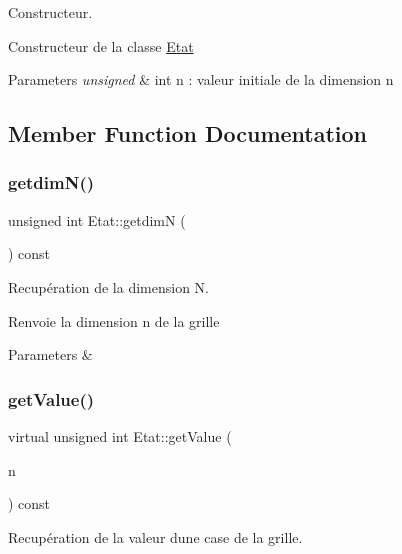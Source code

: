 Constructeur. 

Constructeur de la classe \mbox{\hyperlink{class_etat}{Etat}}


\begin{DoxyParams}{Parameters}
{\em unsigned} & int n \+: valeur initiale de la dimension n \\
\hline
\end{DoxyParams}


\subsection{Member Function Documentation}
\mbox{\label{class_etat_aa30f352f0cd2cc3058a5df552615638c}} 
\subsubsection{\texorpdfstring{getdim\+N()}{getdimN()}}
{\footnotesize\ttfamily unsigned int Etat\+::getdimN (\begin{DoxyParamCaption}{ }\end{DoxyParamCaption}) const\hspace{0.3cm}{\ttfamily [inline]}}



Recupération de la dimension N. 

Renvoie la dimension n de la grille


\begin{DoxyParams}{Parameters}
{\em } & \\
\hline
\end{DoxyParams}
\mbox{\label{class_etat_a70460d74202413a3fe6849c4bfba7bab}} 
\subsubsection{\texorpdfstring{get\+Value()}{getValue()}}
{\footnotesize\ttfamily virtual unsigned int Etat\+::get\+Value (\begin{DoxyParamCaption}\item[{unsigned int}]{n }\end{DoxyParamCaption}) const\hspace{0.3cm}{\ttfamily [pure virtual]}}



Recupération de la valeur d\textquotesingle{}une case de la grille. 

